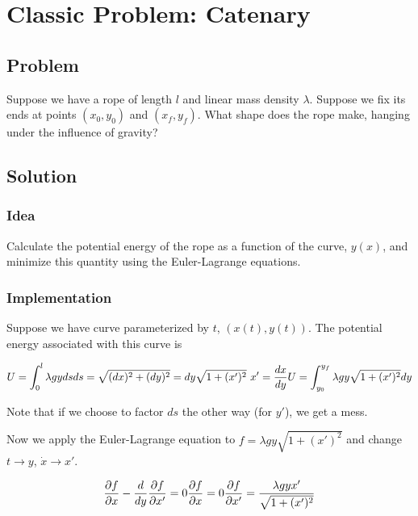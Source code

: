\documentclass{article}
\begin{document}
\section*{Classic Problem: Catenary}

\subsection*{Problem}

Suppose we have a rope of length \(l\) and linear mass density \(\lambda\). { }Suppose we fix its ends at points \(\left(x_0,y_0\right)\) and \(\left(x_f,y_f\right)\).
{ }What shape does the rope make, hanging under the influence of gravity?

\subsection*{Solution}

\subsubsection*{Idea}

Calculate the potential energy of the rope as a function of the curve, \(y(x)\), and minimize this quantity using the Euler-Lagrange equations.

\subsubsection*{Implementation}

Suppose we have curve parameterized by \(t\), \((x(t), y(t))\). { }The potential energy associated with this curve is

\[U=\int _0^l\lambda  g yds\\
\\
ds=\sqrt{(dx)^2+(dy)^2}=dy\sqrt{1+(x')^2}\text{             }x'=\frac{dx}{dy}\\
\\
U=\int _{y_0}^{y_f}\lambda  g y\sqrt{1+(x')^2}dy\]

Note that if we choose to factor \(ds\) the other way (for \(y'\)), we get a mess.

Now we apply the Euler-Lagrange equation to \(f=\lambda  g y\sqrt{1+(x')^2}\) and change \(t\to y\), \(\dot{x}\to x'\).

\[\frac{\partial f}{\partial x}-\frac{d}{dy} \frac{\partial f}{\partial x'}=0\\
\\
\frac{\partial f}{\partial x}=0\\
\\
 \frac{\partial f}{\partial x'}=\frac{\lambda  g y x'}{\sqrt{1+(x')^2}}\]
\end{document}
